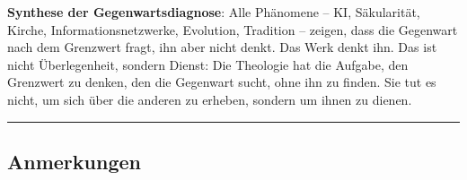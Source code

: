 \documentclass[
  ngerman,
]{article}
\begin{document}
\textbf{Synthese der Gegenwartsdiagnose}: Alle Phänomene -- KI,
Säkularität, Kirche, Informationsnetzwerke, Evolution, Tradition --
zeigen, dass die Gegenwart nach dem Grenzwert fragt, ihn aber nicht
denkt. Das Werk denkt ihn. Das ist nicht Überlegenheit, sondern Dienst:
Die Theologie hat die Aufgabe, den Grenzwert zu denken, den die
Gegenwart sucht, ohne ihn zu finden. Sie tut es nicht, um sich über die
anderen zu erheben, sondern um ihnen zu dienen.

\begin{center}\rule{0.5\linewidth}{0.5pt}\end{center}

\subsection{Anmerkungen}\label{anmerkungen}
\end{document}
